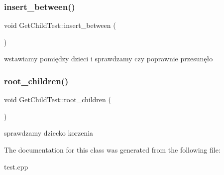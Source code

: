 \subsubsection{\texorpdfstring{insert\+\_\+between()}{insert\_between()}}
{\footnotesize\ttfamily void Get\+Child\+Test\+::insert\+\_\+between (\begin{DoxyParamCaption}{ }\end{DoxyParamCaption})\hspace{0.3cm}{\ttfamily [inline]}}

wstawiamy pomiędzy dzieci i sprawdzamy czy poprawnie przesunęło \mbox{\label{class_get_child_test_a1385e9059ba424b000d5e15ab28bd19b}} 
\subsubsection{\texorpdfstring{root\+\_\+children()}{root\_children()}}
{\footnotesize\ttfamily void Get\+Child\+Test\+::root\+\_\+children (\begin{DoxyParamCaption}{ }\end{DoxyParamCaption})\hspace{0.3cm}{\ttfamily [inline]}}

sprawdzamy dziecko korzenia 

The documentation for this class was generated from the following file\+:\begin{DoxyCompactItemize}
\item 
test.\+cpp\end{DoxyCompactItemize}
